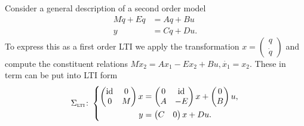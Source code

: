 \begin{example}
    Consider a general description of a second order model
    \begin{align*}
        M \ddot{q} + E \dot{q} &= A q + B u \\
        y &= C q + D u.
    \end{align*}
    To express this as a first order LTI we apply the transformation $x = \begin{pmatrix}
        q \\
        \dot{q}
    \end{pmatrix}$
    and compute the constituent relations $M \dot{x}_2 = A x_1 - E x_2 + Bu, \dot{x_1} = x_2$.
    These in term can be put into LTI form
    \begin{equation*}
        \Sigma_{\textnormal{\scshape lti}} \colon \left\lbrace
        \begin{aligned}
            \begin{pmatrix}
                \text{id}_{} & 0 \\
                0 & M
            \end{pmatrix} x &= \begin{pmatrix}
                0 & \text{id}_{} \\
                A & -E
            \end{pmatrix} x + \begin{pmatrix}
                0 \\
                B
            \end{pmatrix} u, \\
            y &= \begin{pmatrix}
                C & 0
            \end{pmatrix} x + D u.
        \end{aligned}
        \right.
    \end{equation*}
\end{example}

